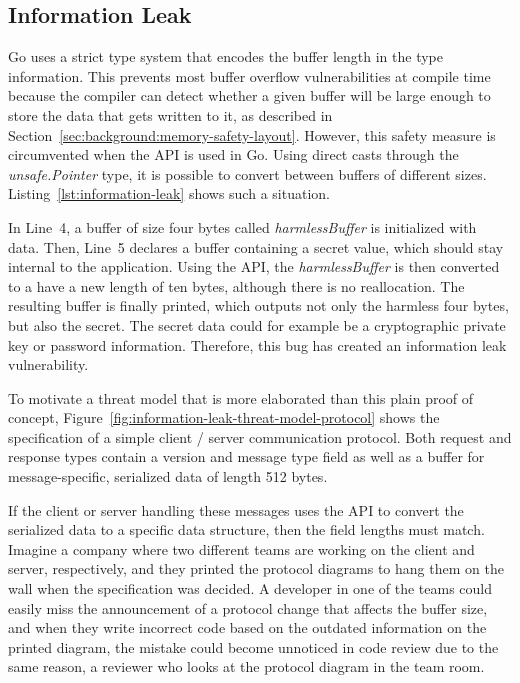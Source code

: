 \subsection{Information Leak}\label{subsec:unsafe-security-problems:buffer-overflow:information-leak}

Go uses a strict type system that encodes the buffer length in the type information.
This prevents most buffer overflow vulnerabilities at compile time because the compiler can detect whether a given
buffer will be large enough to store the data that gets written to it, as described in
Section~\ref{sec:background:memory-safety-layout}.
However, this safety measure is circumvented when the \unsafe{} \acrshort{API} is used in Go.
Using direct casts through the \textit{unsafe.Pointer} type, it is possible to convert between buffers of different
sizes.
Listing~\ref{lst:information-leak} shows such a situation.



In Line~4, a buffer of size four bytes called \textit{harmlessBuffer} is initialized with data.
Then, Line~5 declares a buffer containing a secret value, which should stay internal to the application.
Using the \unsafe{} \acrshort{API}, the \textit{harmlessBuffer} is then converted to a have a new length of ten bytes,
although there is no reallocation.
The resulting buffer is finally printed, which outputs not only the harmless four bytes, but also the secret.
The secret data could for example be a cryptographic private key or password information.
Therefore, this bug has created an information leak vulnerability.

To motivate a threat model that is more elaborated than this plain proof of concept,
Figure~\ref{fig:information-leak-threat-model-protocol} shows the specification of a simple client / server
communication protocol.
Both request and response types contain a version and message type field as well as a buffer for message-specific,
serialized data of length 512 bytes.



If the client or server handling these messages uses the \unsafe{} \acrshort{API} to convert the serialized data to a
specific data structure, then the field lengths must match.
Imagine a company where two different teams are working on the client and server, respectively, and they printed the
protocol diagrams to hang them on the wall when the specification was decided.
A developer in one of the teams could easily miss the announcement of a protocol change that affects the buffer size,
and when they write incorrect code based on the outdated information on the printed diagram, the mistake could become
unnoticed in code review due to the same reason, a reviewer who looks at the protocol diagram in the team room.


